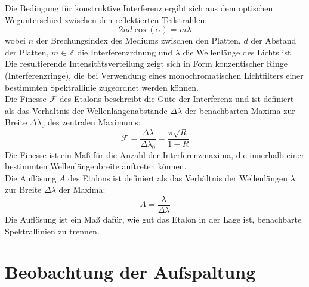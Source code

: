 \noindent Die Bedingung für konstruktive Interferenz ergibt sich aus dem optischen Wegunterschied zwischen den reflektierten Teilstrahlen:
\begin{equation}
    2nd \cos(\alpha) = m \lambda
\end{equation}
wobei $n$ der Brechungsindex des Mediums zwischen den Platten, $d$ der Abstand der Platten, $m \in \mathbb{Z}$ die Interferenzrdnung und $\lambda$ die Wellenlänge des Lichts ist.\\
Die resultierende Intensitätsverteilung zeigt sich in Form konzentischer Ringe (Interferenzringe), die bei Verwendung eines monochromatischen Lichtfilters einer bestimmten Spektrallinie zugeordnet werden können.\\
Die Finesse $\mathcal{F}$ des Etalons beschreibt die Güte der Interferenz und ist definiert als das Verhältnis der Wellenlängenabstände $\Delta \lambda$ der benachbarten Maxima zur Breite $\Delta \lambda_0$ des zentralen Maximums:
\begin{equation}
    \mathcal{F} = \frac{\Delta \lambda}{\Delta \lambda_0} = \frac{\pi\sqrt{R}}{1-R}
\end{equation}
Die Finesse  ist ein Maß für die Anzahl der Interferenzmaxima, die innerhalb einer bestimmten Wellenlängenbreite auftreten können.\\
Die Auflösung $A$ des Etalons ist definiert als das Verhältnis der Wellenlängen $\lambda$ zur Breite $\Delta \lambda$ der Maxima:
\begin{equation}
    A = \frac{\lambda}{\Delta \lambda}
\end{equation}
Die Auflösung ist ein Maß dafür, wie gut das Etalon in der Lage ist, benachbarte Spektrallinien zu trennen.\\
%
%
\section{Beobachtung der Aufspaltung}
%
%
